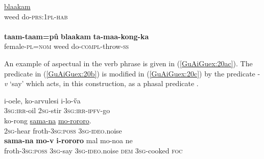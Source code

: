 \documentclass[output=paper]{LSP/langsci}
\begin{document}
\begin{exe}
\ex \label{GuAiex:19ab}
\begin{xlist}
\ex \label{GuAiex:19a}
\gll \underline{blaakam}   \underline{}\\
weed     do-\textsc{prs:1pl-hab}\\
\glt {} \\
\ex \label{GuAiex:19b}
\gll  \textbf{taam-taam=pû}   \textbf{blaakam}   \textbf{ta-maa-kong-ka}\\
female-\textsc{pl=nom}   weed     do-\textsc{compl}{}-throw-\textsc{ss}\\
\glt {}
\end{xlist}
\end{exe}


An example of aspectual  in the verb phrase is given in (\ref{GuAiGuex:20ac}). The predicate in (\ref{GuAiGuex:20b}) is modified in (\ref{GuAiGuex:20c}) by the predicate -\textit{v} `say' which acts, in this construction, as a phasal predicate \citep[][342]{guerin11}.


 \begin{exe}
 \ex \label{GuAiGuex:20ac}
\begin{xlist}
\ex \label{GuAiGuex:20a}
\gll    i-oele, ko-arvulesi i-lo-\H{v}a \\     	       
  \textsc{3sg:irr}-oil \textsc{2sg}-stir  \textsc{3sg:irr-ipfv}-go\\
\glt {} 
\ex \label{GuAiGuex:20b}
\gll   ko-rong     \underline{sama-na}               \underline{mo-rororo}.             \\     	       
 \textsc{2sg}-hear  froth-\textsc{3sg:poss}     \textsc{3sg}-\textsc{ideo}.noise \\
\glt {} 
\ex \label{GuAiGuex:20c}
\gll     \textbf{sama-na}  \textbf{ mo-v }           \textbf{i-rororo}     mal  mo-noa         ne     \\     	       
 froth-\textsc{3sg:poss}  \textsc{3sg}-say   \textsc{3sg}-\textsc{ideo}.noise \textsc{dem}  \textsc{3sg}-cooked   \textsc{foc}  \\
\glt {} 
\end{xlist}
\end{exe}
\end{document}
